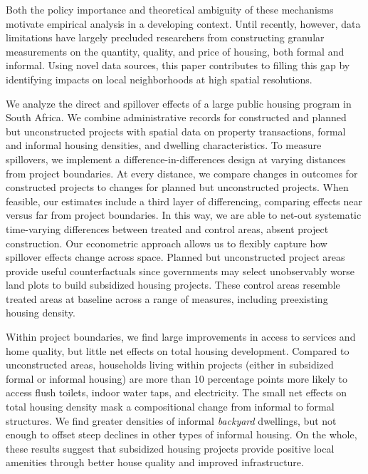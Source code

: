\documentclass[12pt]{article}
\begin{document}
Both the policy importance and theoretical ambiguity of these mechanisms motivate empirical analysis in a developing context.  Until recently, however, data limitations have largely precluded researchers from constructing granular measurements on the quantity, quality, and price of housing, both formal and informal. Using novel data sources, this paper contributes to filling this gap by identifying impacts on local neighborhoods at high spatial resolutions.   

We analyze the direct and spillover effects of a large public housing program in South Africa.  We combine administrative records for constructed and planned but unconstructed projects with spatial data on property transactions, formal and informal housing densities, and dwelling characteristics.  To measure spillovers, we implement a difference-in-differences design at varying distances from pro\-ject boundaries.  At every distance, we compare changes in outcomes for constructed projects to changes for planned but unconstructed projects. When feasible, our estimates include a third layer of differencing, comparing effects near versus far from project boundaries. In this way, we are able to net-out systematic time-varying differences between treated and control areas, absent project construction. Our econometric approach allows us to flexibly capture how spillover effects change across space.  Planned but unconstructed project areas provide useful counterfactuals since governments may select unobservably worse land plots to build subsidized housing projects.  These control areas resemble treated areas at baseline across a range of measures, including preexisting housing density.  


Within project boundaries, we find large improvements in access to services and home quality, but little net effects on total housing development. Compared to unconstructed areas, households living within projects (either in subsidized formal or informal housing) are more than 10 percentage points more likely to access flush toilets, indoor water taps, and electricity. The small net effects on total housing density mask a compositional change from informal to formal structures. We find greater densities of informal {\it backyard} dwellings, but not enough to offset steep declines in other types of informal housing. On the whole, these results suggest that subsidized housing projects provide positive local amenities through better house quality and improved infrastructure.
\end{document}
